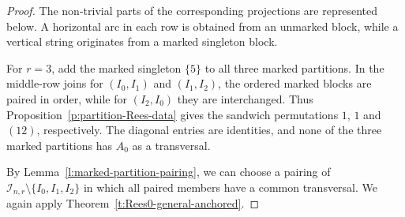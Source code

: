 \documentclass[11pt]{article}
\theoremstyle{plain}
\theoremstyle{remark}
\theoremstyle{definition}
\theoremstyle{plain}
\begin{document}
\begin{proof}
\begingroup
The non-trivial parts of the corresponding projections are represented below. A horizontal arc in
each row is obtained from an unmarked block, while a vertical string originates from a marked singleton
block.
\begin{center}
\end{center}
\endgroup



For $r=3$, add the marked
singleton $\{5\}$ to all three marked partitions. In the middle-row joins for $(I_0,I_1)$ and
$(I_1,I_2)$, the ordered marked blocks are paired in order, while for
$(I_2,I_0)$ they are interchanged. Thus Proposition~\ref{p:partition-Rees-data}
gives the sandwich permutations $1$, $1$ and $(12)$, respectively. The
diagonal entries are identities, and none of the three marked partitions has
$A_0$ as a transversal.

{By Lemma~\ref{l:marked-partition-pairing}, we can choose a pairing of $\mathcal I_{n,r}\setminus\{I_0,I_1,I_2\}$ in which all paired members have a common transversal. We again apply Theorem~\ref{t:Rees0-general-anchored}.}


\end{proof}
\end{document}

